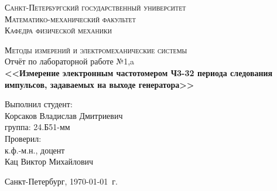 \begin{titlepage}
\begin{center}
\textsc{Санкт-Петербургский государственный университет\\
Математико-механический факультет\\
Кафедра физической механики\\}

\vfill

\textsc{Методы измерений и электромеханические системы\\[3mm]}
Отчёт по лабораторной работе №1,a\\[6mm]


\textbf{\large<<Измерение электронным частотомером Ч3-32 периода следования импульсов, задаваемых на выходе генератора>>}

\vfill
\end{center}

\hfill
\begin{minipage}{.5\textwidth}
Выполнил студент:\\[2mm] 
Корсаков Владислав Дмитриевич\\
группа: 24.Б51-мм\\[5mm]

Проверил:\\[2mm] 
к.ф.-м.н., доцент\\
Кац Виктор Михайлович
\end{minipage}%
\vfill
\begin{center}
 Санкт-Петербург, \yeardate\today\ г.
\end{center}
\end{titlepage}
